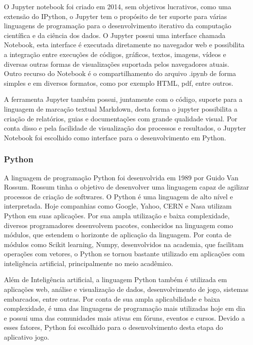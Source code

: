         O Jupyter notebook foi criado em 2014, sem objetivos lucrativos, como uma extensão do IPython, o Jupyter tem o propósito de ter suporte para várias linguagens de programação para o desenvolvimento iterativo da computação científica e da ciência dos dados. O Jupyter possui uma interface chamada Notebook, esta interface é executada diretamente no navegador web e possibilita a integração entre  execuções de códigos, gráficos, textos, imagens, vídeos e diversas outras formas de visualizações suportada pelos navegadores atuais. Outro recurso do Notebook é o compartilhamento do arquivo .ipynb de forma simples e em diversos formatos, como por exemplo HTML, pdf, entre outros.	

    	A ferramenta Jupyter também possui, juntamente com o código, suporte para a linguagem de marcação textual Markdown, desta forma o jupyter possibilita a criação de relatórios, guias e documentações com grande qualidade visual.  Por conta disso e pela facilidade de visualização dos processos e resultados, o Jupyter Notebook foi escolhido como interface para o desenvolvimento em Python. 	

    \subsubsection{Python}	
    
        A linguagem de programação Python foi desenvolvida em 1989 por Guido Van Rossum. Rossum tinha o objetivo de desenvolver uma linguagem capaz de agilizar processos de criação de softwares. 	
    	O Python é uma linguagem de alto nível e interpretada. Hoje companhias como Google, Yahoo, CERN e Nasa utilizam Python em suas aplicações. Por sua ampla utilização e baixa complexidade, diversos programadores desenvolvem pacotes, conhecidos na linguagem como módulos, que estendem o horizonte de aplicação da linguagem. Por conta de módulos como Scikit learning, Numpy, desenvolvidos na academia, que facilitam operações com vetores, o Python se tornou bastante utilizado em aplicações com inteligência artificial,  principalmente no meio acadêmico.	

        Além de Inteligência artificial, a linguagem Python também é utilizada em aplicações web, análise e visualização de dados, desenvolvimento de jogo, sistemas embarcados, entre outras. Por conta de sua ampla aplicabilidade e baixa complexidade,  é uma das linguagens de programação mais utilizadas hoje em dia e possui uma das comunidades mais ativas em fóruns, eventos e cursos. Devido a esses fatores, Python foi escolhido para o desenvolvimento desta etapa do aplicativo jogo.  	

